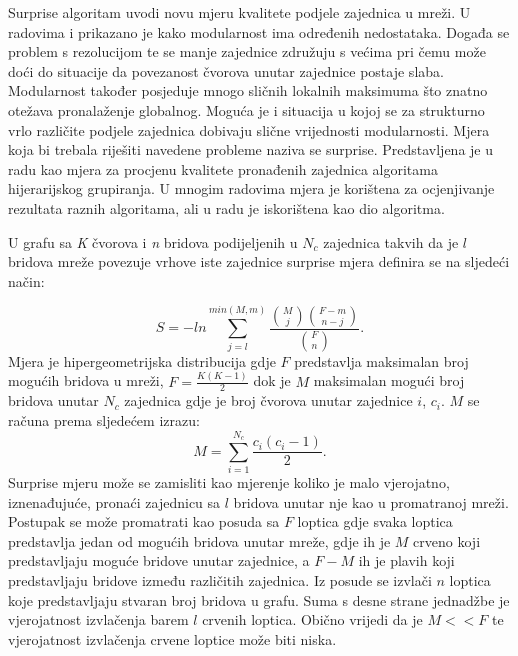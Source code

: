 Surprise algoritam uvodi novu mjeru kvalitete podjele zajednica u mreži. U radovima \cite{blondel2008fast} i \cite{gamermann2022algorithm} prikazano je kako modularnost ima određenih nedostataka. Događa se problem s rezolucijom te se manje zajednice združuju s većima pri čemu može doći do situacije da povezanost čvorova unutar zajednice postaje slaba. Modularnost također posjeduje mnogo sličnih lokalnih maksimuma što znatno otežava pronalaženje globalnog. Moguća je i situacija u kojoj se za strukturno vrlo različite podjele zajednica dobivaju slične vrijednosti modularnosti. Mjera koja bi trebala riješiti navedene probleme naziva se surprise. Predstavljena je u radu \cite{aldecoa2010jerarca} kao mjera za procjenu kvalitete pronađenih zajednica algoritama hijerarijskog grupiranja. U mnogim radovima mjera je korištena za ocjenjivanje rezultata raznih algoritama, ali u radu \cite{gamermann2022algorithm} je iskorištena kao dio algoritma.


U grafu sa \textit{K} čvorova i \textit{n} bridova podijeljenih u $N_{c}$ zajednica takvih da je $l$ bridova mreže povezuje vrhove iste zajednice surprise mjera definira se na sljedeći način:

\begin{equation}
	S = - ln \sum_{j = l}^{min(M,m)} \frac{ {M \choose j} {F-m \choose n-j} }{ {F \choose n}}.
\end{equation}
Mjera je hipergeometrijska distribucija gdje $F$ predstavlja maksimalan broj mogućih bridova u mreži, $F = \frac{K(K-1)}{2}$ dok je $M$ maksimalan mogući broj bridova unutar $N_{c}$ zajednica gdje je broj čvorova unutar zajednice $i$, $c_{i}$. $M$ se računa prema sljedećem izrazu:
\begin{equation}
	M = \sum_{i=1}^{N_{c}} \frac{c_{i}(c_{i}-1)}{2}.
\end{equation} 
Surprise mjeru može se zamisliti kao mjerenje koliko je malo vjerojatno, iznenađujuće, pronaći zajednicu sa $l$ bridova unutar nje kao u promatranoj mreži. Postupak se može promatrati kao posuda sa $F$ loptica gdje svaka loptica predstavlja jedan od mogućih bridova unutar mreže, gdje ih je $M$ crveno koji predstavljaju moguće bridove unutar zajednice, a $F-M$ ih je plavih koji predstavljaju bridove između različitih zajednica. Iz posude se izvlači $n$ loptica koje predstavljaju stvaran broj bridova u grafu. Suma s desne strane jednadžbe je vjerojatnost izvlačenja barem $l$ crvenih loptica. Obično vrijedi da je $M << F$ te vjerojatnost izvlačenja crvene loptice može biti niska.

